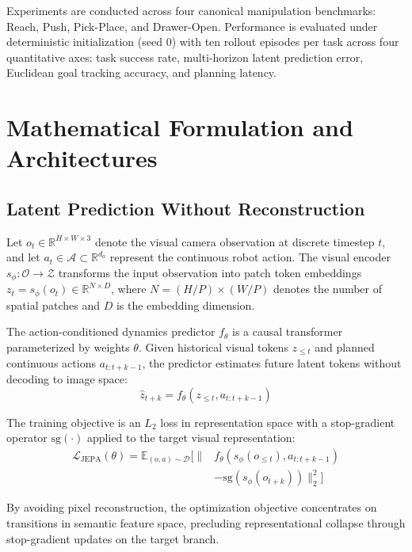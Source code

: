 \documentclass[10pt,journal,compsoc]{IEEEtran}
\begin{document}
Experiments are conducted across four canonical manipulation benchmarks: Reach, Push, Pick-Place, and Drawer-Open. Performance is evaluated under deterministic initialization (seed 0) with ten rollout episodes per task across four quantitative axes: task success rate, multi-horizon latent prediction error, Euclidean goal tracking accuracy, and planning latency.

\section{Mathematical Formulation and Architectures}

\subsection{Latent Prediction Without Reconstruction}

Let $o_t \in \mathbb{R}^{H \times W \times 3}$ denote the visual camera observation at discrete timestep $t$, and let $a_t \in \mathcal{A} \subset \mathbb{R}^{d_a}$ represent the continuous robot action. The visual encoder $s_\phi: \mathcal{O} \to \mathcal{Z}$ transforms the input observation into patch token embeddings $z_t = s_\phi(o_t) \in \mathbb{R}^{N \times D}$, where $N = (H/P) \times (W/P)$ denotes the number of spatial patches and $D$ is the embedding dimension.

The action-conditioned dynamics predictor $f_\theta$ is a causal transformer parameterized by weights $\theta$. Given historical visual tokens $z_{\le t}$ and planned continuous actions $a_{t:t+k-1}$, the predictor estimates future latent tokens without decoding to image space:
\begin{equation}
    \hat{z}_{t+k} = f_\theta(z_{\le t}, a_{t:t+k-1})
\end{equation}

The training objective is an $L_2$ loss in representation space with a stop-gradient operator $\text{sg}(\cdot)$ applied to the target visual representation:
\begin{equation}
\begin{aligned}
    \mathcal{L}_{\text{JEPA}}(\theta) = \mathbb{E}_{(o, a) \sim \mathcal{D}} \Big[ \big\| & f_\theta(s_\phi(o_{\le t}), a_{t:t+k-1}) \\
    &- \text{sg}\left(s_\phi(o_{t+k})\right) \big\|_2^2 \Big]
\end{aligned}
\end{equation}

By avoiding pixel reconstruction, the optimization objective concentrates on transitions in semantic feature space, precluding representational collapse through stop-gradient updates on the target branch.
\end{document}
